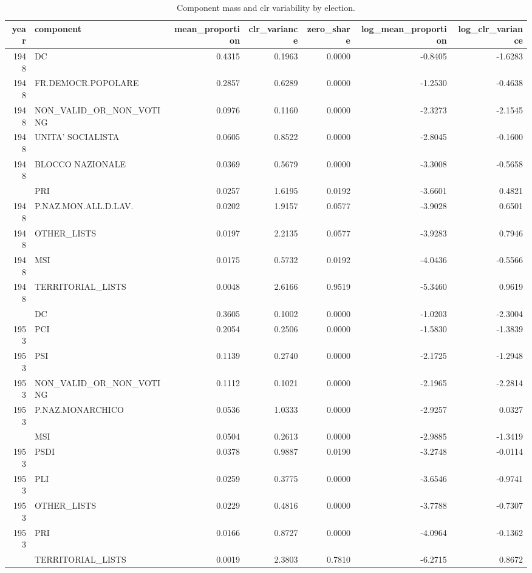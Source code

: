 
\begin{longtable}[t]{rlrrrrr}
\caption{\label{tab:app_mass_variability}Component mass and clr variability by election.}\\
\toprule
year & component & mean\_proportion & clr\_variance & zero\_share & log\_mean\_proportion & log\_clr\_variance\\
\midrule
1948 & DC & 0.4315 & 0.1963 & 0.0000 & -0.8405 & -1.6283\\
1948 & FR.DEMOCR.POPOLARE & 0.2857 & 0.6289 & 0.0000 & -1.2530 & -0.4638\\
1948 & NON\_VALID\_OR\_NON\_VOTING & 0.0976 & 0.1160 & 0.0000 & -2.3273 & -2.1545\\
1948 & UNITA' SOCIALISTA & 0.0605 & 0.8522 & 0.0000 & -2.8045 & -0.1600\\
1948 & BLOCCO NAZIONALE & 0.0369 & 0.5679 & 0.0000 & -3.3008 & -0.5658\\
\addlinespace
1948 & PRI & 0.0257 & 1.6195 & 0.0192 & -3.6601 & 0.4821\\
1948 & P.NAZ.MON.ALL.D.LAV. & 0.0202 & 1.9157 & 0.0577 & -3.9028 & 0.6501\\
1948 & OTHER\_LISTS & 0.0197 & 2.2135 & 0.0577 & -3.9283 & 0.7946\\
1948 & MSI & 0.0175 & 0.5732 & 0.0192 & -4.0436 & -0.5566\\
1948 & TERRITORIAL\_LISTS & 0.0048 & 2.6166 & 0.9519 & -5.3460 & 0.9619\\
\addlinespace
1953 & DC & 0.3605 & 0.1002 & 0.0000 & -1.0203 & -2.3004\\
1953 & PCI & 0.2054 & 0.2506 & 0.0000 & -1.5830 & -1.3839\\
1953 & PSI & 0.1139 & 0.2740 & 0.0000 & -2.1725 & -1.2948\\
1953 & NON\_VALID\_OR\_NON\_VOTING & 0.1112 & 0.1021 & 0.0000 & -2.1965 & -2.2814\\
1953 & P.NAZ.MONARCHICO & 0.0536 & 1.0333 & 0.0000 & -2.9257 & 0.0327\\
\addlinespace
1953 & MSI & 0.0504 & 0.2613 & 0.0000 & -2.9885 & -1.3419\\
1953 & PSDI & 0.0378 & 0.9887 & 0.0190 & -3.2748 & -0.0114\\
1953 & PLI & 0.0259 & 0.3775 & 0.0000 & -3.6546 & -0.9741\\
1953 & OTHER\_LISTS & 0.0229 & 0.4816 & 0.0000 & -3.7788 & -0.7307\\
1953 & PRI & 0.0166 & 0.8727 & 0.0000 & -4.0964 & -0.1362\\
\addlinespace
1953 & TERRITORIAL\_LISTS & 0.0019 & 2.3803 & 0.7810 & -6.2715 & 0.8672\\

\end{longtable}
